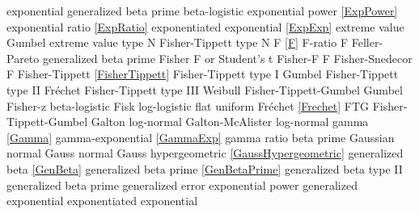 exponential generalized beta prime 	\dotfill	beta-logistic						\ncite	%
exponential power				\dotfill	\eqref{ExpPower}					\ncite
exponential ratio				\dotfill	\eqref{ExpRatio}					\ncite	%
exponentiated exponential			\dotfill	\eqref{ExpExp}						\ncite	%
extreme value					\dotfill	Gumbel 							\ncite
extreme value type N 			\dotfill	Fisher-Tippett type N 				\ncite	%
%
F							\dotfill	\eqref{F} 							\ncite	%
F-ratio						\dotfill	F								\ncite	%
Feller-Pareto					\dotfill	generalized beta prime 				\ncite	%
Fisher						\dotfill	F or Student's t 					\ncite	%
Fisher-F 						\dotfill	F 								\ncite	%
Fisher-Snedecor 				\dotfill	F 								\ncite	%
Fisher-Tippett					\dotfill	\eqref{FisherTippett} 					\ncite	%
Fisher-Tippett type I				\dotfill	Gumbel 							\ncite	%
Fisher-Tippett type II				\dotfill	Fr\'{e}chet  						\ncite	%
Fisher-Tippett type III			\dotfill	Weibull 							\ncite	%
Fisher-Tippett-Gumbel			\dotfill	Gumbel  							\ncite	%
Fisher-z						\dotfill	beta-logistic						\ncite	%
Fisk							\dotfill	log-logistic						\ncite 	%
flat 							\dotfill	uniform 							\ncite	%
Fr\'{e}chet 					\dotfill	\eqref{Frechet} 						\ncite	%
FTG							\dotfill	Fisher-Tippett-Gumbel 				\ncite	%
%
Galton						\dotfill	log-normal 						\ncite	%
Galton-McAlister				\dotfill	log-normal 						\ncite	%
gamma						\dotfill	\eqref{Gamma} 					\ncite	%
gamma-exponential				\dotfill	\eqref{GammaExp}					\ncite	%
gamma ratio					\dotfill	beta prime						\ncite	%
Gaussian 						\dotfill	normal 							\ncite	%
Gauss 						\dotfill	normal 							\ncite	%
Gauss hypergeometric			\dotfill	\eqref{GaussHypergeometric}			\ncite
generalized beta 				\dotfill	\eqref{GenBeta} 					\ncite	%
generalized beta prime 			\dotfill	\eqref{GenBetaPrime} 				 %
generalized beta type II			\dotfill	generalized beta prime				
generalized error				\dotfill	exponential power					\ncite
generalized exponential			\dotfill	exponentiated exponential 			    %
